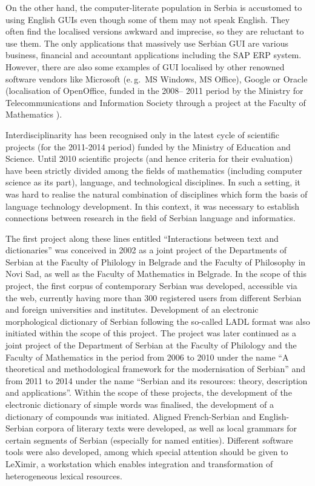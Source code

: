 {\begin{multicols}{2}
On the other hand, the computer-literate population in Serbia is accustomed to using English GUIs even though some of them may not speak English. They often find the localised versions awkward and imprecise, so they are reluctant to use them. The only applications that massively use Serbian GUI are various business, financial and accountant applications including the SAP ERP system. However, there are also some examples of GUI localised by other renowned software vendors like Microsoft (e.\,g.~MS Windows, MS Office), Google or Oracle (localisation of OpenOffice, funded in the 2008-- 2011 period by the Ministry for Telecommunications and Information Society through a project at the Faculty of Mathematics \cite{OO_MATF}).

Interdisciplinarity has been recognised only in the latest cycle of scientific projects (for the 2011-2014 period) funded by the Ministry of Education and Science. Until 2010 scientific projects (and hence criteria for their evaluation) have been strictly divided among the fields of mathematics (including computer science as its part), language, and technological disciplines. In such a setting, it was hard to realise the natural combination of disciplines which form the basis of language technology development. In this context, it was necessary to establish connections between research in the field of Serbian language and informatics. 

The first project along these lines entitled “Interactions between text and dictionaries” was conceived in 2002 as a joint project of the Departments of Serbian at the Faculty of Philology in Belgrade and the Faculty of Philosophy in Novi Sad, as well as the Faculty of Mathematics in Belgrade. In the scope of this project, the first corpus of contemporary Serbian was developed, \cite{KORPUS} accessible via the web, currently having more than 300 registered users from different Serbian and foreign universities and institutes. Development of an electronic morphological dictionary of Serbian following the so-called LADL format was also initiated within the scope of this project. \cite{KRSTEV} The project was later continued as a joint project of the Department of Serbian at the Faculty of Philology and the Faculty of Mathematics in the period from 2006 to 2010 under the name “A theoretical and methodological framework for the modernisation of Serbian” and from 2011 to 2014 under the name “Serbian and its resources: theory, description and applications”. Within the scope of these projects, the development of the electronic dictionary of simple words was finalised, the development of a dictionary of compounds was initiated. Aligned French-Serbian and English-Serbian corpora of literary texts were developed, as well as local grammars for certain segments of Serbian (especially for named entities). Different software tools were also developed, among which special attention should be given to LeXimir, a workstation which enables integration and transformation of heterogeneous lexical resources.
 

\end{multicols}}
